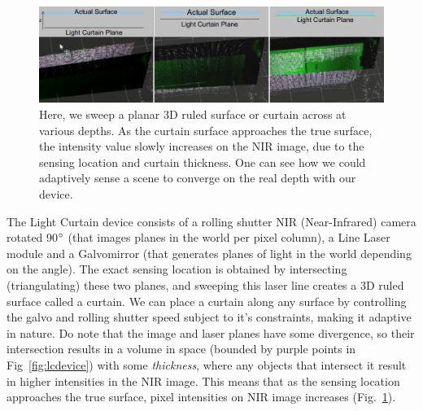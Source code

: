 \begin{figure}[h]
    \centering
    \begin{minipage}{0.5\textwidth}
        \centering
        \includegraphics[width=1.0\textwidth]{figures/planesweep.png} %
    \end{minipage}\hfill
    \centering
    \caption{Here, we sweep a planar 3D ruled surface or curtain across at various depths. As the curtain surface approaches the true surface, the intensity value slowly increases on the NIR image, due to the sensing location and curtain thickness. One can see how we could adaptively sense a scene to converge on the real depth with our device.}
    \label{fig:planesweep} 
 \end{figure}

The Light Curtain device consists of a rolling shutter NIR (Near-Infrared) camera rotated 90$\degree$ (that images planes in the world per pixel column), a Line Laser module and a Galvomirror (that generates planes of light in the world depending on the angle). The exact sensing location is obtained by intersecting (triangulating) these two planes, and sweeping this laser line creates a 3D ruled surface called a curtain. We can place a curtain along any surface by controlling the galvo and rolling shutter speed subject to it's constraints, making it adaptive in nature. Do note that the image and laser planes have some divergence, so their intersection results in a volume in space (bounded by purple points in Fig~\ref{fig:lcdevice}) with some \textit{thickness}, where any objects that intersect it result in higher intensities in the NIR image. This means that as the sensing location approaches the true surface, pixel intensities on NIR image increases (Fig.~\ref{fig:planesweep}). 


